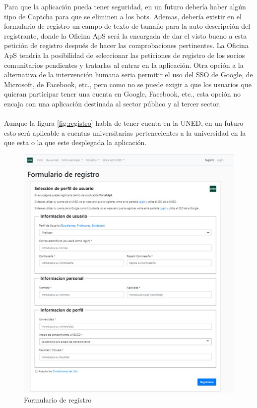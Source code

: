 \documentclass[11pt]{book}
\begin{document}
Para que la aplicación pueda tener seguridad, en un futuro debería haber algún tipo de Captcha para que se eliminen a los bots. Ademas, debería existir en el formulario de registro un campo de texto de tamaño para la auto-descripción del registrante, donde la Oficina ApS será la encargada de dar el visto bueno a esta petición de registro después de hacer las comprobaciones pertinentes. La Oficina ApS tendría la posibilidad de seleccionar las peticiones de registro de los socios comunitarios pendientes y tratarlas al entrar en la aplicación. Otra opción a la alternativa de la intervención humana seria permitir el uso del SSO de Google, de Microsoft, de Facebook, etc., pero como no se puede exigir a que los usuarios que quieran participar tener una cuenta en Google, Facebook, etc., esta opción no encaja con una aplicación destinada al sector público y al tercer sector.\\\\
Aunque la figura \ref{fig:registro} habla de tener cuenta en la UNED, en un futuro esto será aplicable a cuentas universitarias pertenecientes a la universidad en la que esta o la que este desplegada la aplicación.


\begin{figure}[t]
	\centering
	\includegraphics[scale=0.7]{registro}
	\caption{Formulario de registro}
\end{figure}
\end{document}
